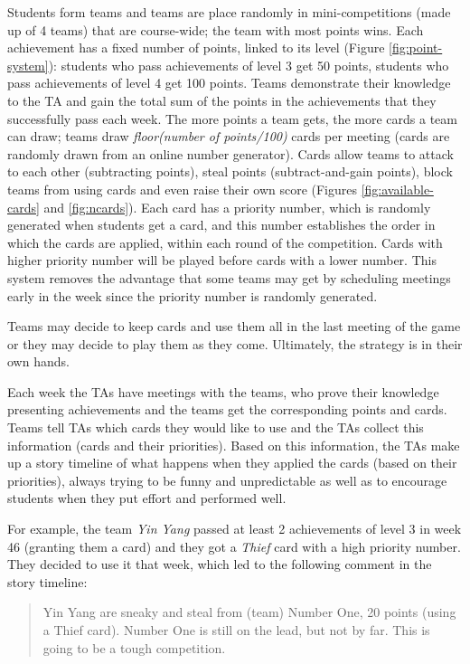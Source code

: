 \documentclass[sigconf]{acmart}
\begin{document}
Students form teams and teams are place randomly in mini-competitions
(made up of 4 teams) that are course-wide; the team with most points
wins. Each achievement has a fixed number of points, linked to its level
(Figure \ref{fig:point-system}): students who pass achievements of level
3 get 50 points, students who pass achievements of level 4 get 100
points. Teams demonstrate their knowledge to the TA and gain the total
sum of the points in the achievements that they successfully pass each
week. The more points a team gets, the more cards a team can draw; teams
draw \textit{floor(number of points/100)} cards per meeting (cards are
randomly drawn from an online number generator). Cards allow teams to
attack to each other (subtracting points), steal points
(subtract-and-gain points), block teams from using cards and even raise
their own score (Figures \ref{fig:available-cards} and
\ref{fig:ncards}). Each card has a priority number, which is randomly
generated when students get a card, and this number establishes the
order in which the cards are applied, within each round of the
competition. Cards with higher priority number will be played before
cards with a lower number. This system removes the advantage that some
teams may get by scheduling meetings early in the week since the
priority number is randomly generated.

Teams may decide to keep cards and use them all in the last meeting of
the game or they may decide to play them as they come. Ultimately, the
strategy is in their own hands.

Each week the TAs have meetings with the teams, who prove their
knowledge presenting achievements and the teams get the corresponding
points and cards. Teams tell TAs which cards they would like to use and
the TAs collect this information (cards and their priorities). Based on
this information, the TAs make up a story timeline of what happens when
they applied the cards (based on their priorities), always trying to be
funny and unpredictable as well as to encourage students when they put
effort and performed well.

For example, the team \textit{Yin Yang} passed at least 2 achievements
of level 3 in week 46 (granting them a card) and they got a
\textit{Thief} card with a high priority number. They decided to use it
that week, which led to the following comment in the story timeline:

\begin{quote}
Yin Yang are sneaky and steal from (team) Number One, 20 points (using a Thief card).
Number One is still on the lead, but not by far. This is going to be a tough competition.
\end{quote}
\end{document}
